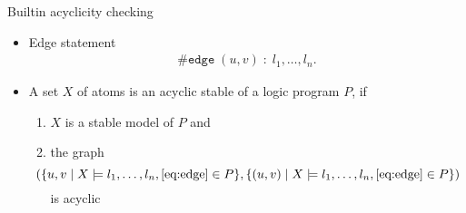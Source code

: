 \begin{frame}{Builtin acyclicity checking}
  \bigskip
  \begin{itemize}
  \item<1-> Edge statement
    \begin{align}\label{eq:edge}
      \#\mathtt{edge}\; (u,v)\; :\; l_1,\dots,l_n.
    \end{align}
  \item <2-> A set $X$ of atoms is an acyclic stable of a logic program $P$, if
    \begin{enumerate}%
    \item $X$ is a stable model of $P$ and
    \item the graph
      \[\hspace{-15pt}
      (\{u,v\mid X\models l_1,\dots,l_n, \eqref{eq:edge}\in P\},\{(u,v)\mid X\models l_1,\dots,l_n, \eqref{eq:edge}\in P\})
      \]
      is acyclic
    \end{enumerate}
  \end{itemize}
\end{frame}
%
